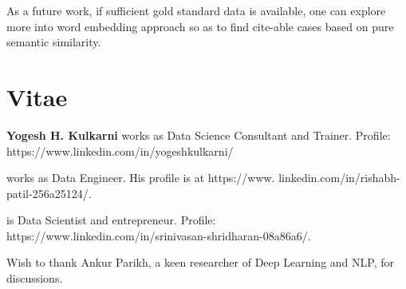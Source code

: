 As a future work, if sufficient gold standard data is available, one can explore more into word embedding approach so as to find cite-able cases based on pure semantic similarity.

\section*{Vitae}

{\bf Yogesh H. Kulkarni} works as Data Science Consultant and Trainer. Profile: https://www.linkedin.com/in/yogeshkulkarni/

 works as Data Engineer. His profile is at https://www. linkedin.com/in/rishabh-patil-256a25124/.

 is Data Scientist and entrepreneur. Profile: https://www.linkedin.com/in/srinivasan-shridharan-08a86a6/.
\begin{acks}
  Wish to thank Ankur Parikh, a keen researcher of Deep Learning and NLP, for discussions.
\end{acks}

